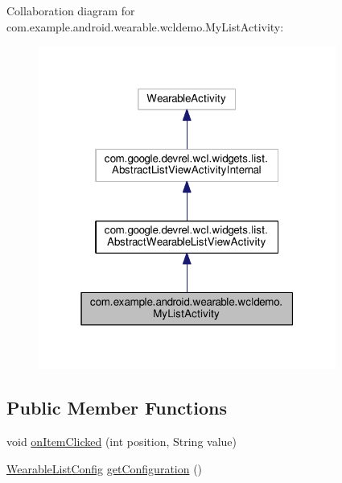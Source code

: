 Collaboration diagram for com.\+example.\+android.\+wearable.\+wcldemo.\+My\+List\+Activity\+:\nopagebreak
\begin{figure}[H]
\begin{center}
\leavevmode
\includegraphics[width=277pt]{db/d4b/classcom_1_1example_1_1android_1_1wearable_1_1wcldemo_1_1MyListActivity__coll__graph}
\end{center}
\end{figure}
\subsection*{Public Member Functions}
\begin{DoxyCompactItemize}
\item 
void \hyperlink{classcom_1_1example_1_1android_1_1wearable_1_1wcldemo_1_1MyListActivity_a399a7ccb7a66ef28df4d601f21095b25}{on\+Item\+Clicked} (int position, String value)
\item 
\hyperlink{classcom_1_1google_1_1devrel_1_1wcl_1_1widgets_1_1list_1_1WearableListConfig}{Wearable\+List\+Config} \hyperlink{classcom_1_1example_1_1android_1_1wearable_1_1wcldemo_1_1MyListActivity_a0566083fd4b31bd9daa85ba32cd279e2}{get\+Configuration} ()
\end{DoxyCompactItemize}
